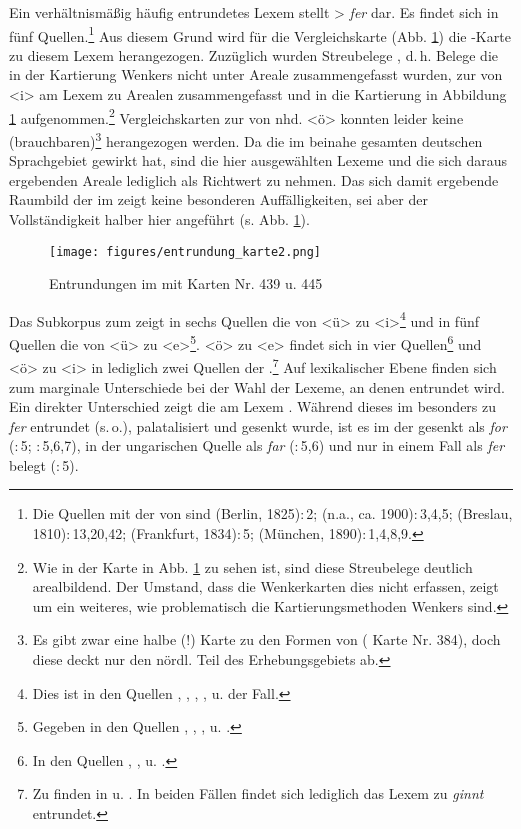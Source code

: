 Ein verhältnismäßig häufig entrundetes Lexem stellt  > \textit{fer} dar. Es findet sich in fünf Quellen.\footnote{Die Quellen mit der  von  sind   (Berlin, 1825):\,2;  (n.a., ca. 1900):\,3,4,5;  (Breslau, 1810):\,13,20,42;  (Frankfurt, 1834):\,5;  (München, 1890):\,1,4,8,9.} Aus diesem Grund wird für die Vergleichskarte (Abb. \ref{karteentrundung}) die -Karte zu diesem Lexem herangezogen. Zuzüglich wurden Streubelege , d.\,h. Belege die in der Kartierung Wenkers nicht unter Areale zusammengefasst wurden, zur  von <i> am Lexem  zu Arealen zusammengefasst und in die Kartierung in Abbildung \ref{karteentrundung} aufgenommen.\footnote{Wie in der Karte in Abb. \ref{karteentrundung} zu sehen ist, sind diese Streubelege deutlich arealbildend. Der Umstand, dass die Wenkerkarten dies nicht erfassen, zeigt um ein weiteres, wie problematisch die Kartierungsmethoden Wenkers sind.} Vergleichskarten zur  von nhd. <ö> konnten leider keine (brauchbaren)\footnote{Es gibt zwar eine halbe (!) Karte zu den Formen von  ( Karte Nr. 384), doch diese deckt nur den nördl. Teil des Erhebungsgebiets ab.} herangezogen werden. Da die  im beinahe gesamten deutschen Sprachgebiet gewirkt hat, sind die hier ausgewählten Lexeme und die sich daraus ergebenden Areale lediglich als Richtwert zu nehmen. Das sich damit ergebende Raumbild der  im  zeigt keine besonderen Auffälligkeiten, sei aber der Vollständigkeit halber hier angeführt (s. Abb. \ref{karteentrundung}). \\


 \begin{figure}[h!]
		\centering
\texttt{[image: figures/entrundung\_karte2.png]}
		\caption{\label{karteentrundung} Entrundungen im  mit  Karten Nr. 439 u. 445}
		\end{figure}
\FloatBarrier


Das Subkorpus zum  zeigt in sechs Quellen die  von <ü> zu <i>\footnote{Dies ist in den Quellen , , , ,  u.  der Fall.} und in fünf Quellen die von <ü> zu <e>\footnote{Gegeben in den Quellen , , ,  u. .}. <ö> zu <e> findet sich in vier Quellen\footnote{In den Quellen , ,  u. .} und <ö> zu <i> in lediglich zwei Quellen der .\footnote{Zu finden in  u. . In beiden Fällen findet sich lediglich das Lexem  zu \textit{ginnt} entrundet.} Auf lexikalischer Ebene finden sich zum  marginale Unterschiede bei der Wahl der Lexeme, an denen entrundet wird. Ein direkter Unterschied zeigt die  am Lexem . Während dieses im  besonders zu \textit{fer} entrundet (s.\,o.), palatalisiert und gesenkt wurde, ist es im  der  gesenkt als \textit{for} (:\,5; :\,5,6,7), in der ungarischen Quelle  als \textit{far} (:\,5,6) und nur in einem Fall als \textit{fer} belegt (:\,5).



